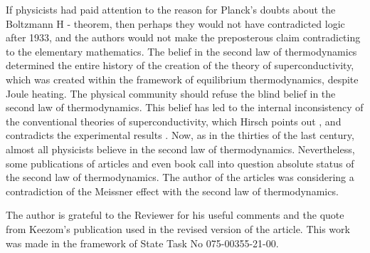 \documentclass[twocolumn,secnumarabic,amssymb, nobibnotes, aps, prd]{revtex4}
\begin{document}
If physicists had paid attention to the reason for Planck's doubts about the Boltzmann H - theorem, then perhaps they would not have contradicted logic after 1933, and the authors \cite{Science2009PC,Birge2009} would not make the preposterous claim contradicting to the elementary mathematics. The belief in the second law of thermodynamics determined the entire history of the creation of the theory of superconductivity, which was created within the framework of equilibrium thermodynamics, despite Joule heating. The physical community should refuse the blind belief in the second law of thermodynamics. This belief has led to the internal inconsistency of the conventional theories of superconductivity, which Hirsch points out \cite{Hirsch2020Physica,Hirsch2020EPL,Hirsch2020ModPhys}, and contradicts the experimental results \cite{Physica2019,Letter2007,LP1962,PC2007,Science2009PC,PRL2009PC}. Now, as in the thirties of the last century, almost all physicists believe in the second law of thermodynamics. Nevertheless, some publications of articles and even book \cite{Book05} call into question absolute status of the second law of thermodynamics. The author of the articles \cite{Peter2004,Peter2010} was considering a contradiction of the Meissner effect with the second law of thermodynamics.    
          
The author is grateful to the Reviewer for his useful comments and the quote from Keezom's publication \cite{Keesom1934} used in the revised version of the article. This work was made in the framework of State Task No 075-00355-21-00.
\end{document}
